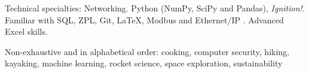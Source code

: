 \documentclass[10pt,a4paper]{article} %
\begin{document}

\inlineheadsection %
{Technical specialties:}
{Networking. Python (NumPy, SciPy and Pandas), \textit{Ignition!}.  Familiar with SQL, ZPL, Git, \LaTeX, Modbus and Ethernet/IP . Advanced Excel skills.}
 
 



\spacedhrule{1.6em}{-0.4em} %



\inlineheadsection %
{Non-exhaustive and in alphabetical order:}
{cooking, computer security, hiking, kayaking, machine learning,  rocket science, space exploration, sustainability}
\end{document}
